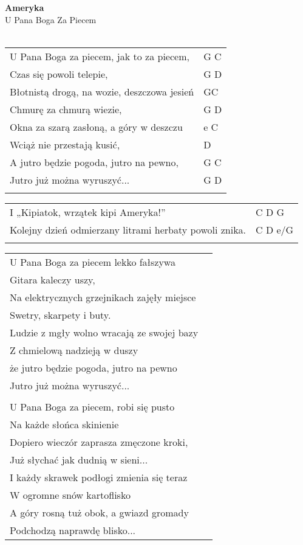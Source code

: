 \documentclass[a5paper]{article}
\begin{document}


\noindent
\fontsize{12pt}{15pt}\selectfont
\textbf{Ameryka} \\
\fontsize{8pt}{10pt}\selectfont
U Pana Boga Za Piecem \\ \\
\fontsize{10pt}{12pt}\selectfont
{}
\begin{tabular}{@{}p{9.5cm}p{3cm}@{}}
\noindent
U Pana Boga za piecem, jak to za piecem, & G C \\
Czas się powoli telepie, & G D \\
Błotnistą drogą, na wozie, deszczowa jesień & GC \\
Chmurę za chmurą wiezie, & G D \\
Okna za szarą zasłoną, a góry w deszczu & e C \\
Wciąż nie przestają kusić, & D \\
A jutro będzie pogoda, jutro na pewno, & G C \\
Jutro już można wyruszyć... & G D \\ \\
\end{tabular}

\noindent
\begin{tabular}{@{}p{8.5cm}p{3cm}@{}}
I „Kipiatok, wrzątek kipi Ameryka!” & C D G \\
Kolejny dzień odmierzany litrami herbaty powoli znika. & C D e/G \\ \\
\end{tabular}

\noindent
\begin{tabular}{@{}p{8.5cm}p{3cm}@{}}
U Pana Boga za piecem lekko fałszywa \\
Gitara kaleczy uszy, \\
Na elektrycznych grzejnikach zajęły miejsce \\
Swetry, skarpety i buty. \\
Ludzie z mgły wolno wracają ze swojej bazy \\
Z chmielową nadzieją w duszy \\
że jutro będzie pogoda, jutro na pewno \\
Jutro już można wyruszyć... \\ \\

U Pana Boga za piecem, robi się pusto \\
Na każde słońca skinienie \\
Dopiero wieczór zaprasza zmęczone kroki, \\
Już słychać jak dudnią w sieni... \\
I każdy skrawek podłogi zmienia się teraz \\
W ogromne snów kartoflisko \\
A góry rosną tuż obok, a gwiazd gromady \\
Podchodzą naprawdę blisko... 
\end{tabular}
\end{document}
